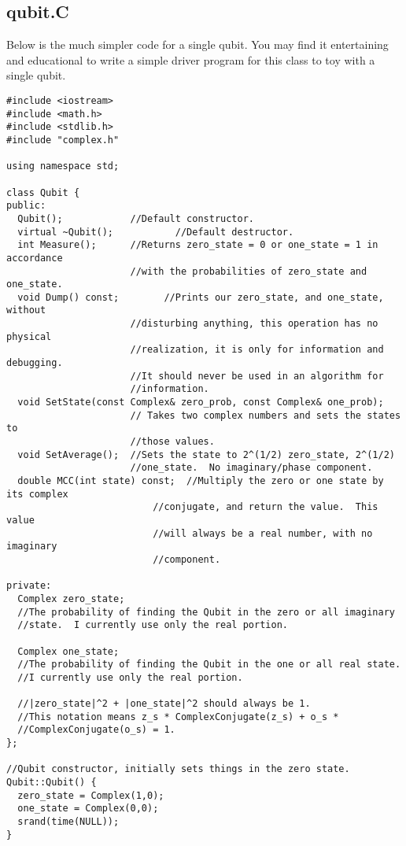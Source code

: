 \documentclass[]{article}
\begin{document}
\subsection{qubit.C}

Below is the much simpler code for a single qubit.  You may find it
entertaining and educational to write a simple driver program for this
class to toy with a single qubit.

\begin{verbatim}
#include <iostream>
#include <math.h>
#include <stdlib.h>
#include "complex.h"

using namespace std;

class Qubit {
public:
  Qubit();            //Default constructor.
  virtual ~Qubit();           //Default destructor.
  int Measure();      //Returns zero_state = 0 or one_state = 1 in accordance
                      //with the probabilities of zero_state and one_state.
  void Dump() const;        //Prints our zero_state, and one_state, without 
                      //disturbing anything, this operation has no physical
                      //realization, it is only for information and debugging. 
                      //It should never be used in an algorithm for 
                      //information.
  void SetState(const Complex& zero_prob, const Complex& one_prob);
                      // Takes two complex numbers and sets the states to 
                      //those values.
  void SetAverage();  //Sets the state to 2^(1/2) zero_state, 2^(1/2) 
                      //one_state.  No imaginary/phase component.
  double MCC(int state) const;  //Multiply the zero or one state by its complex
                          //conjugate, and return the value.  This value 
                          //will always be a real number, with no imaginary 
                          //component.   

private:
  Complex zero_state;  
  //The probability of finding the Qubit in the zero or all imaginary 
  //state.  I currently use only the real portion.  

  Complex one_state;   
  //The probability of finding the Qubit in the one or all real state.
  //I currently use only the real portion.

  //|zero_state|^2 + |one_state|^2 should always be 1.
  //This notation means z_s * ComplexConjugate(z_s) + o_s * 
  //ComplexConjugate(o_s) = 1.
};

//Qubit constructor, initially sets things in the zero state.
Qubit::Qubit() {
  zero_state = Complex(1,0); 
  one_state = Complex(0,0);
  srand(time(NULL));
}


\end{verbatim}
\end{document}
